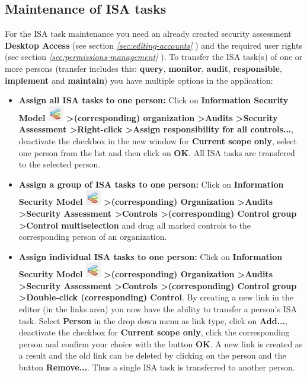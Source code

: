 \documentclass[a4paper,10pt]{book}
\begin{document}
\subsection{Maintenance of ISA tasks}

For the ISA task maintenance you need an already created security assessment \textbf{Desktop Access} (see section {\em \ref{sec:editing-accounts} }) and the required user rights (see section {\em \ref{sec:permissions-management} }).
To transfer the ISA task(s) of one or more persons (transfer includes this: \textbf{query}, \textbf{monitor}, \textbf{audit},
\textbf{responsible}, \textbf{implement} and \textbf{maintain}) you have multiple options in the application:
\begin{itemize}
\item \textbf{Assign all ISA tasks to one person:} Click on \textbf{Information Security Model \includegraphics[height=2ex]{Icon/Informationssicherheitsmodell.png} \textgreater (corresponding) organization \textgreater Audits \textgreater Security Assessment \textgreater Right-click \textgreater Assign responsibility for all controls...},
deactivate the checkbox in the new window for \textbf{Current scope only}, select one person from the list and then click on \textbf{OK}.
All ISA tasks are transfered to the selected person.
\item \textbf{Assign a group of ISA tasks to one person:} Click on \textbf{Information Security Model \includegraphics[height=2ex]{Icon/Informationssicherheitsmodell.png} \textgreater (corresponding) Organization \textgreater Audits \textgreater Security Assessment \textgreater Controls \textgreater (corresponding) Control group \textgreater Control multiselection}
and drag all marked controls to the corresponding person of an organization.
\item \textbf{Assign individual ISA tasks to one person:} Click on \textbf{Information Security Model \includegraphics[height=2ex]{Icon/Informationssicherheitsmodell.png} \textgreater (corresponding) Organization \textgreater Audits \textgreater Security Assessment \textgreater Controls \textgreater (corresponding) Control group \textgreater Double-click (corresponding) Control}.
By creating a new link in the editor (in the links area) you now have the ability to transfer a person's ISA task. Select \textbf{Person} in the drop down menu as link type,
click on \textbf{Add...}, deactivate the checkbox for \textbf{Current scope only}, click the corresponding person and confirm your choice with the button \textbf{OK}.
A new link is created as a result and the old link can be deleted by clicking on the person and the button \textbf{Remove...}. Thus a single ISA task is transferred to another person.
\end{itemize}
\end{document}
